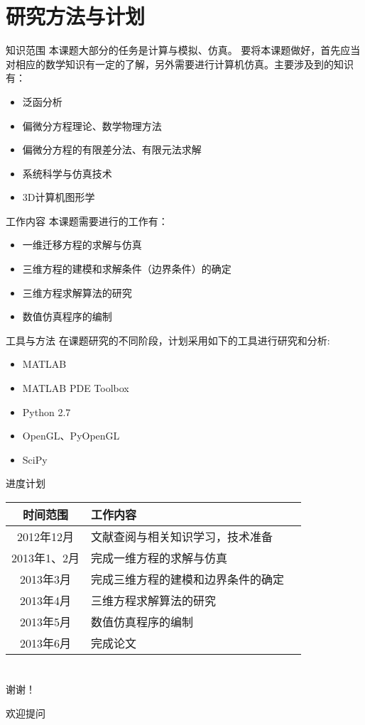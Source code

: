 \documentclass[xcolor=dvipsnames]{beamer}
\begin{document}
\section{研究方法与计划}
	\begin{frame}{知识范围}
	本课题大部分的任务是计算与模拟、仿真。
	要将本课题做好，首先应当对相应的数学知识有一定的了解，另外需要进行计算机仿真。主要涉及到的知识有：
	\begin{itemize}\setlength{\itemsep}{0em}
	\fangsong
	\item 泛函分析
	\item 偏微分方程理论、数学物理方法
	\item 偏微分方程的有限差分法、有限元法求解
	\item 系统科学与仿真技术
	\item 3D计算机图形学
	\end{itemize}\par
	\end{frame}
	\begin{frame}{工作内容}
	本课题需要进行的工作有：
	\begin{itemize}
	\fangsong
	\item 一维迁移方程的求解与仿真
	\item 三维方程的建模和求解条件（边界条件）的确定
	\item 三维方程求解算法的研究
	\item 数值仿真程序的编制
	\end{itemize}
	\end{frame}
	\begin{frame}{工具与方法}
	在课题研究的不同阶段，计划采用如下的工具进行研究和分析:
	\begin{itemize}
	\fangsong
	\item MATLAB
	\item MATLAB PDE Toolbox
	\item Python 2.7
	\item OpenGL、PyOpenGL
	\item SciPy
	\end{itemize}
	\end{frame}
	\begin{frame}{进度计划}
	\kaishu
	\begin{tabularx}{10cm}{cXc}
	\toprule
	时间范围 & \centering 工作内容 &  \\
	\midrule
	2012年12月 					& 文献查阅与相关知识学习，技术准备	&  \\
	2013年1、2月			 		& 完成一维方程的求解与仿真			 &  \\
	2013年3月					& 完成三维方程的建模和边界条件的确定   &  \\
	2013年4月					& 三维方程求解算法的研究				&	 \\
	2013年5月					& 数值仿真程序的编制				&	 \\
	2013年6月					& 完成论文						&     \\
	\bottomrule
	\end{tabularx}
	\end{frame}
	\section*{}
	\begin{frame}
	\begin{center}
	\Large
	谢谢！\par
	欢迎提问
	\end{center}
	\end{frame}
\end{document}
